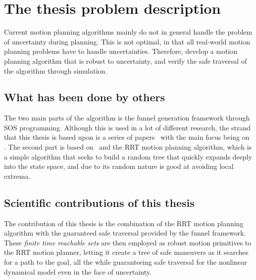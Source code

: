 \section{The thesis problem description}

Current motion planning algorithms mainly do not in general handle the problem
of uncertainty during planning. This is not optimal, in that all real-world
motion planning problems have to handle uncertainties. Therefore, develop a
motion planning algorithm that is robust to uncertainty, and verify the safe
traversal of the algorithm through simulation.

\subsection{What has been done by others}

The two main parts of the \rrtfunnel{} algorithm is the funnel generation
framework through \ac{SOS} programming. Although this is used in a lot of
different research, the strand that this thesis is based upon is a series of
papers~\cite{Tobenkin_2011,tedrakeLQRtreesFeedbackMotion2009,majumdarRobustOnlineMotion2013,majumdarFunnelLibrariesRealtime2017,ahmadi2014dsos}
with the main focus being on \cite{majumdarFunnelLibrariesRealtime2017}. The
second part is based on~\textcite{article} and the \ac{RRT} motion planning
algorithm, which is a simple algorithm that seeks to build a random tree that
quickly expands deeply into the state space, and due to its random nature is
good at avoiding local extrema.

\subsection{Scientific contributions of this thesis}

The contribution of this thesis is the combination of the \ac{RRT} motion
planning algorithm with the guaranteed safe traversal provided by the funnel
framework. These \textit{finite time reachable sets} are then employed as robust
motion primitives to the \ac{RRT} motion planner, letting it create a tree of
safe maneuvers as it searches for a path to the goal, all the while guaranteeing
safe traversal for the nonlinear dynamical model even in the face of
uncertainty.
